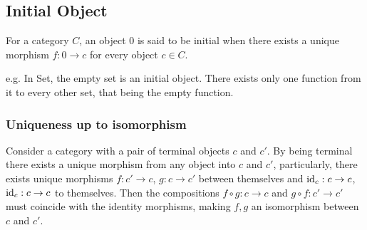 \subsection{Initial Object}

For a category $C$, an object $0$ is said to be initial when there exists a
unique morphism $f: 0\to c$ for every object $c\in C$.
\parencite{awodey:category_theory}

e.g. In Set, the empty set is an initial object. There exists only one function
from it to every other set, that being the empty function.

\subsubsection*{Uniqueness up to isomorphism}

Consider a category with a pair of terminal objects $c$ and $c'$. By being
terminal there exists a unique morphism from any object into $c$ and $c'$,
particularly, there exists unique morphisms $f: c' \to c$, $g: c \to c'$ between
themselves and $\mathrm{id}_c: c\to c$, $\mathrm{id}_c: c\to c$ to themselves.
Then the compositions $f\circ g:c\to c$ and $g\circ f:c' \to c'$ must coincide
with the identity morphisms, making $f,g$ an isomorphism between $c$ and $c'$.